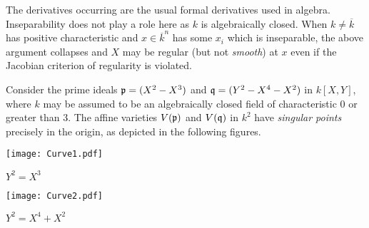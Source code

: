 \documentclass[a4paper,parskip=half,numbers=enddot, DIV=12, headheight=30pt]{scrreprt}
\begin{document}
\begin{rem*}
    The derivatives occurring are the usual formal derivatives used in algebra. Inseparability does not play a role here as $k$ is algebraically closed. When $k\neq \overline{k}$ has positive characteristic and $x\in \overline{k}^n$ has some $x_i$ which is inseparable, the above argument collapses and $X$ may be regular (but not \emph{smooth}) at $x$ even if the Jacobian criterion of regularity is violated.
\end{rem*}
\begin{example*}
    Consider the prime ideals $\mathfrak{p}= (X^2-X^3)$ and $\mathfrak{q} = (Y^2-X^4-X^2)$ in $k[X,Y]$, where $k$ may be assumed to be an algebraically closed field of characteristic $0$ or greater than $3$. The affine varieties $V(\mathfrak{p})$ and $V(\mathfrak{q})$ in $k^2$ have \emph{singular points} precisely in the origin, as depicted in the following figures.
\end{example*}
\begin{center}
	\begin{minipage}{0.42\textwidth}
		\centering
		\texttt{[image: Curve1.pdf]}
		
		$Y^2=X^3$
	\end{minipage}
	\begin{minipage}{0.42\textwidth}
		\centering
		\texttt{[image: Curve2.pdf]}
		
		$Y^2=X^4+X^2$
	\end{minipage}
\end{center}
\end{document}
